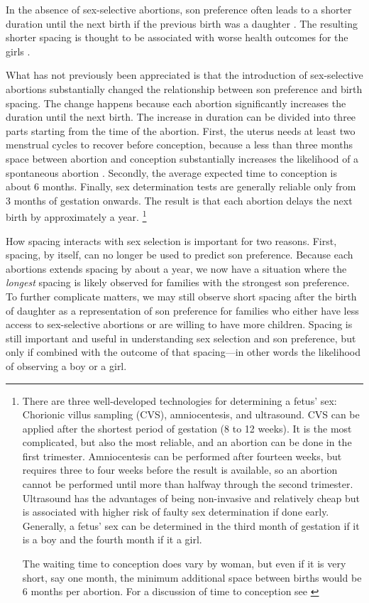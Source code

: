\documentclass[12pt,letterpaper]{article}
\begin{document}

In the absence of sex-selective abortions, son preference often leads to a shorter duration 
until the next birth if the previous birth was a daughter  
\citep[see, for example,][]{Das1987,Rahman1993,Pong1994,Haughton1996,Arnold1997}.
The resulting shorter spacing is thought to be associated with worse health outcomes for
the girls \citep{arnold98,Whitworth2002,Rutstein2005,Conde-Agudelo2006}.

What has not previously been appreciated is that the introduction of sex-selective 
abortions substantially changed the relationship between son preference and birth spacing.
The change happens because each abortion significantly increases the duration until the
next birth.
The increase in duration can be divided into three parts starting from the time of
the abortion.
First, the uterus needs at least two menstrual cycles to recover 
before conception, because a less than three months space 
between abortion and conception substantially increases the likelihood 
of a spontaneous abortion \citep{zhou00b}.
Secondly, the average expected time to conception is about 6 months.
Finally, sex determination tests are generally reliable only from 3 months of gestation onwards.
The result is that each abortion delays the next birth by approximately a year.%
\footnote{
There are three well-developed technologies for determining a fetus' sex: 
Chorionic villus sampling (CVS), amniocentesis, and ultrasound.
CVS can be applied after the shortest period
of gestation (8 to 12 weeks).
It is the most complicated, but also the most reliable, and an abortion can be done in 
the first trimester.
Amniocentesis can be performed after fourteen weeks, but requires three to four weeks
before the result is available, so an abortion cannot be performed until more than 
halfway through the second trimester.
Ultrasound has the advantages of being non-invasive and relatively cheap but 
is associated with higher risk of faulty sex determination if done early.
Generally, a fetus' sex can be determined in the third month of gestation if it is a
boy and the fourth month if it a girl.

The waiting time to conception does vary by woman, but
even if it is very short, say one  month, the minimum additional space between
births would be 6 months per abortion.
For a discussion of time to conception see \citep{Wang2003}
}

How spacing interacts with sex selection is important for two reasons.
First, 
spacing, by itself, can no longer be used to predict son preference. 
Because each abortions extends spacing by about a year, we now have a situation 
where the \emph{longest} spacing is likely observed for families with the 
strongest son preference.
To further complicate matters, 
we may still observe short spacing after the birth of daughter as a representation 
of son preference for families who either have less access to sex-selective 
abortions or are willing to have more children.
Spacing is still important and useful in understanding sex selection and son
preference, but only if combined with the outcome of that spacing---in other words 
the likelihood of observing a boy or a girl.
\end{document}
